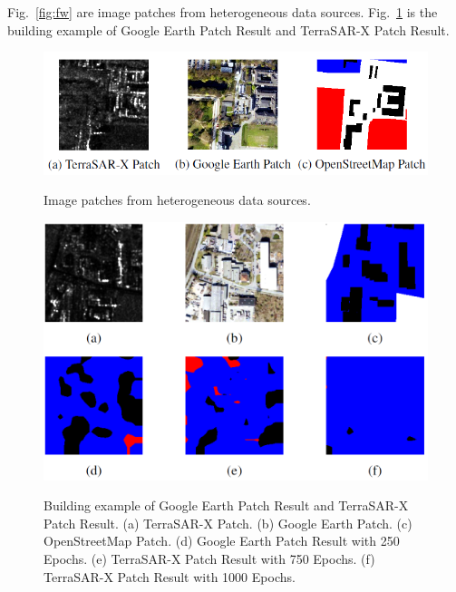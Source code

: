 \documentclass[]{IEEEtran}
\begin{document}
	Fig.~\ref{fig:fw} are image patches from heterogeneous data sources. Fig.~\ref{fig:rt} is the building example of Google Earth Patch Result and TerraSAR-X Patch Result.
	


\newpage
\begin{figure}[!hbt]
		\vspace{1.7cm}
		\begin{center}
			\includegraphics[width=\columnwidth]{dt}
			\caption{Image patches from heterogeneous data sources.}
			\label{fig:fw}
		    \hspace{0.5cm}
			\includegraphics[width=\columnwidth]{rr}
			\caption{Building example of Google Earth Patch Result and TerraSAR-X Patch Result. (a) TerraSAR-X Patch. (b) Google Earth Patch. (c) OpenStreetMap Patch. (d) Google Earth Patch Result with 250 Epochs. (e) TerraSAR-X Patch Result with 750 Epochs. (f) TerraSAR-X Patch Result with 1000 Epochs.}
			\label{fig:rt}
		\end{center}
	\end{figure}
\end{document}
